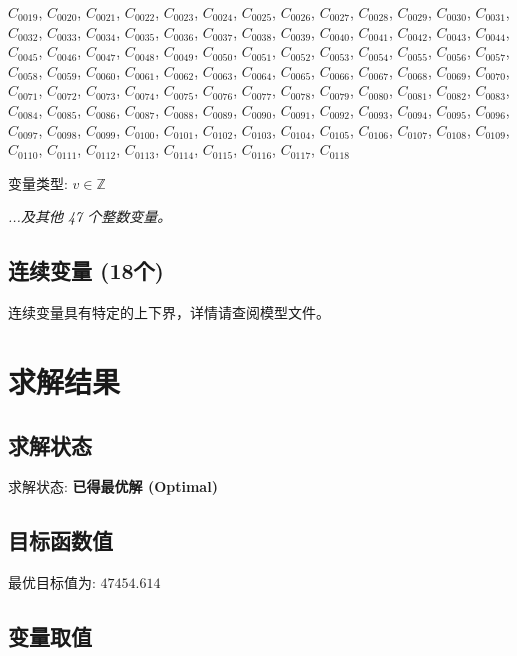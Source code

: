 \documentclass[a4paper,10pt]{article}
\begin{document}
{\small $C_{0019}$, $C_{0020}$, $C_{0021}$, $C_{0022}$, $C_{0023}$, $C_{0024}$, $C_{0025}$, $C_{0026}$, $C_{0027}$, $C_{0028}$, $C_{0029}$, $C_{0030}$, $C_{0031}$, $C_{0032}$, $C_{0033}$, $C_{0034}$, $C_{0035}$, $C_{0036}$, $C_{0037}$, $C_{0038}$, $C_{0039}$, $C_{0040}$, $C_{0041}$, $C_{0042}$, $C_{0043}$, $C_{0044}$, $C_{0045}$, $C_{0046}$, $C_{0047}$, $C_{0048}$, $C_{0049}$, $C_{0050}$, $C_{0051}$, $C_{0052}$, $C_{0053}$, $C_{0054}$, $C_{0055}$, $C_{0056}$, $C_{0057}$, $C_{0058}$, $C_{0059}$, $C_{0060}$, $C_{0061}$, $C_{0062}$, $C_{0063}$, $C_{0064}$, $C_{0065}$, $C_{0066}$, $C_{0067}$, $C_{0068}$, $C_{0069}$, $C_{0070}$, $C_{0071}$, $C_{0072}$, $C_{0073}$, $C_{0074}$, $C_{0075}$, $C_{0076}$, $C_{0077}$, $C_{0078}$, $C_{0079}$, $C_{0080}$, $C_{0081}$, $C_{0082}$, $C_{0083}$, $C_{0084}$, $C_{0085}$, $C_{0086}$, $C_{0087}$, $C_{0088}$, $C_{0089}$, $C_{0090}$, $C_{0091}$, $C_{0092}$, $C_{0093}$, $C_{0094}$, $C_{0095}$, $C_{0096}$, $C_{0097}$, $C_{0098}$, $C_{0099}$, $C_{0100}$, $C_{0101}$, $C_{0102}$, $C_{0103}$, $C_{0104}$, $C_{0105}$, $C_{0106}$, $C_{0107}$, $C_{0108}$, $C_{0109}$, $C_{0110}$, $C_{0111}$, $C_{0112}$, $C_{0113}$, $C_{0114}$, $C_{0115}$, $C_{0116}$, $C_{0117}$, $C_{0118}$}

变量类型: $v \in \mathbb{Z}$

\textit{...及其他 47 个整数变量。}

\subsection{连续变量 (18个)}

连续变量具有特定的上下界，详情请查阅模型文件。

\section{求解结果}

\subsection{求解状态}

求解状态: \textbf{已得最优解 (Optimal)}

\subsection{目标函数值}

最优目标值为: $\mathbf{47454.614}$

\subsection{变量取值}
\end{document}
